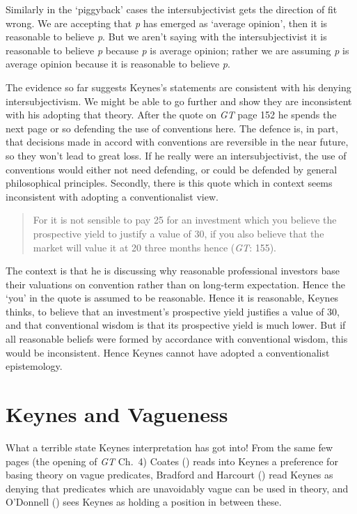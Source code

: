 \documentclass[
  11pt,
  letterpaper,
  DIV=11,
  numbers=noendperiod,
  twoside]{scrartcl}
\begin{document}
Similarly in the `piggyback' cases the intersubjectivist gets the
direction of fit wrong. We are accepting that \emph{p} has emerged as
`average opinion', then it is reasonable to believe \emph{p}. But we
aren't saying with the intersubjectivist it is reasonable to believe
\emph{p} because \emph{p} is average opinion; rather we are assuming
\emph{p} is average opinion because it is reasonable to believe
\emph{p}.

The evidence so far suggests Keynes's statements are consistent with his
denying intersubjectivism. We might be able to go further and show they
are inconsistent with his adopting that theory. After the quote on
\emph{GT} page 152 he spends the next page or so defending the use of
conventions here. The defence is, in part, that decisions made in accord
with conventions are reversible in the near future, so they won't lead
to great loss. If he really were an intersubjectivist, the use of
conventions would either not need defending, or could be defended by
general philosophical principles. Secondly, there is this quote which in
context seems inconsistent with adopting a conventionalist view.

\begin{quote}
For it is not sensible to pay 25 for an investment which you believe the
prospective yield to justify a value of 30, if you also believe that the
market will value it at 20 three months hence (\emph{GT}: 155).
\end{quote}

The context is that he is discussing why reasonable professional
investors base their valuations on convention rather than on long-term
expectation. Hence the `you' in the quote is assumed to be reasonable.
Hence it is reasonable, Keynes thinks, to believe that an investment's
prospective yield justifies a value of 30, and that conventional wisdom
is that its prospective yield is much lower. But if all reasonable
beliefs were formed by accordance with conventional wisdom, this would
be inconsistent. Hence Keynes cannot have adopted a conventionalist
epistemology.

\section{Keynes and Vagueness}\label{keynes-and-vagueness}

What a terrible state Keynes interpretation has got into! From the same
few pages (the opening of \emph{GT} Ch.~4) Coates
() reads into Keynes a preference for
basing theory on vague predicates, Bradford and Harcourt
() read Keynes as denying that
predicates which are unavoidably vague can be used in theory, and
O'Donnell () sees Keynes as holding a
position in between these.
\end{document}
